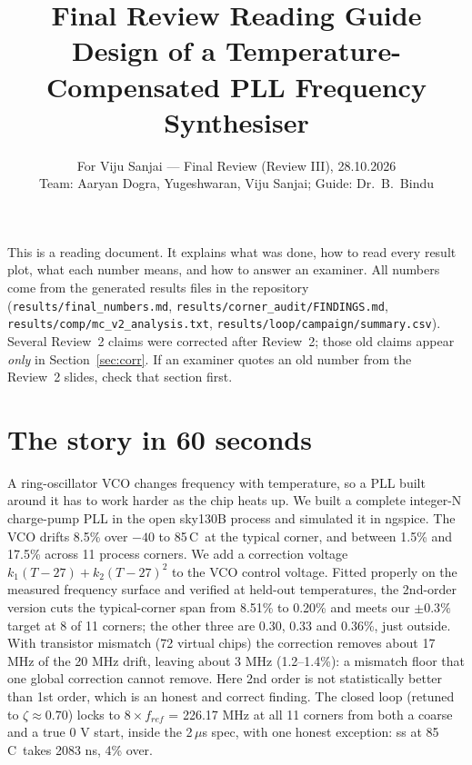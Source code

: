 \documentclass[11pt,a4paper]{article}
\title{\color{navy}\textbf{Final Review Reading Guide}\\[4pt]\large Design of a Temperature-Compensated PLL Frequency Synthesiser}
\author{For Viju Sanjai --- Final Review (Review III), 28.10.2026\\ Team: Aaryan Dogra, Yugeshwaran, Viju Sanjai; Guide: Dr.\ B.\ Bindu}
\date{}
\newcommand{\degC}{\textdegree C}
\begin{document}
\maketitle
\vspace{-1.5em}
\noindent This is a reading document. It explains what was done, how to read every result plot, what each number means, and how to answer an examiner. All numbers come from the generated results files in the repository (\texttt{results/final\_numbers.md}, \texttt{results/corner\_audit/FINDINGS.md}, \texttt{results/comp/mc\_v2\_analysis.txt}, \texttt{results/loop/campaign/summary.csv}). Several Review~2 claims were corrected after Review~2; those old claims appear \emph{only} in Section~\ref{sec:corr}. If an examiner quotes an old number from the Review~2 slides, check that section first.

\tableofcontents
\newpage

\section{The story in 60 seconds}
\begin{say}
A ring-oscillator VCO changes frequency with temperature, so a PLL built around it has to work harder as the chip heats up. We built a complete integer-N charge-pump PLL in the open sky130B process and simulated it in ngspice. The VCO drifts 8.5\% over $-40$ to 85\,\degC\ at the typical corner, and between 1.5\% and 17.5\% across 11 process corners. We add a correction voltage $k_1(T-27)+k_2(T-27)^2$ to the VCO control voltage. Fitted properly on the measured frequency surface and verified at held-out temperatures, the 2nd-order version cuts the typical-corner span from 8.51\% to 0.20\% and meets our $\pm0.3\%$ target at 8 of 11 corners; the other three are 0.30, 0.33 and 0.36\%, just outside. With transistor mismatch (72 virtual chips) the correction removes about 17 MHz of the 20 MHz drift, leaving about 3 MHz (1.2--1.4\%): a mismatch floor that one global correction cannot remove. Here 2nd order is not statistically better than 1st order, which is an honest and correct finding. The closed loop (retuned to $\zeta\approx0.70$) locks to $8\times f_{ref}$ = 226.17 MHz at all 11 corners from both a coarse and a true 0 V start, inside the 2\,$\mu$s spec, with one honest exception: ss at 85\,\degC\ takes 2083 ns, 4\% over.
\end{say}
\end{document}
